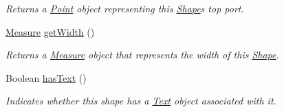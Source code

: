 \begin{DoxyCompactItemize}
\begin{DoxyCompactList}\small\item\em Returns a \hyperlink{classcom_1_1aarrelaakso_1_1drawl_1_1_point}{Point} object representing this \hyperlink{classcom_1_1aarrelaakso_1_1drawl_1_1_shape}{Shape}\textquotesingle{}s top port. \end{DoxyCompactList}\item 
\hyperlink{classcom_1_1aarrelaakso_1_1drawl_1_1_measure}{Measure} \hyperlink{classcom_1_1aarrelaakso_1_1drawl_1_1_shape_a3e2c58984f1bcbc2e9e86cf30868561e}{get\+Width} ()
\begin{DoxyCompactList}\small\item\em Returns a \hyperlink{classcom_1_1aarrelaakso_1_1drawl_1_1_measure}{Measure} object that represents the width of this \hyperlink{classcom_1_1aarrelaakso_1_1drawl_1_1_shape}{Shape}. \end{DoxyCompactList}\item 
Boolean \hyperlink{classcom_1_1aarrelaakso_1_1drawl_1_1_shape_a037a5515b2a6e1df1d1981aa5516e78e}{has\+Text} ()
\begin{DoxyCompactList}\small\item\em Indicates whether this shape has a \hyperlink{classcom_1_1aarrelaakso_1_1drawl_1_1_text}{Text} object associated with it. \end{DoxyCompactList}\end{DoxyCompactItemize}
